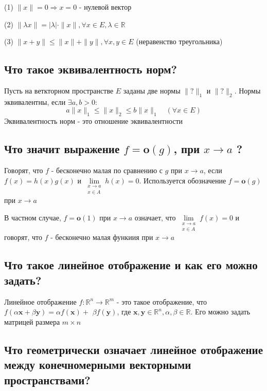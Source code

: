\documentclass[a4paper]{article}
\begin{document}
(1) $\|x\|=0 \Longrightarrow x=0$ - нулевой вектор

(2) $\|\lambda x\|=|\lambda| \cdot\|x\|, \forall x \in E, \lambda \in \mathbb{R}$

(3) $\|x+y\| \leqslant\|x\|+\|y\|, \forall x, y \in E$ (неравенство треугольника)

\subsection{Что такое эквивалентность норм?}


Пусть на веткторном пространстве $E$ заданы две нормы $\|?\|_{1}$ и $\|?\|_{2}$. Нормы эквивалентны, если $\exists a, b>0:$
$$
a\|x\|_{1} \leqslant\|x\|_{2} \leqslant b\|x\|_{1} \quad(\forall x \in E)
$$
Эквивалентность норм - это отношение эквивалентности

\subsection{Что значит выражение $f=\mathbf{o}(g)$, при $x \rightarrow a$ ?}

Говорят, что $f$ - бесконечно малая по сравнению с $g$ при $x \rightarrow a$, если $f(x)=h(x) g(x)$ и $\lim\limits_{\substack{x \rightarrow a \\ x \in A}} h(x)=0$. Используется обозначение $f=\mathbf{o}(g)$ при $x \rightarrow a$

В частном случае, $f=\mathbf{o}(1)$ при $x \rightarrow a$ означает, что $\lim\limits_{\substack{x \rightarrow a \\ x \in A}} f(x)=0$ и говорят, что
$f$ - бесконечно малая функиия при $x \rightarrow a$

\subsection{Что такое линейное отображение и как его можно задать?}

Линейное отображение $f: \mathbb{R}^{n} \rightarrow \mathbb{R}^{m}$ - это такое отображение, что $f(\alpha \mathbf{x}+\beta \mathbf{y})=\alpha f(\mathbf{x})+$ $\beta f(\mathbf{y})$, где $\mathbf{x}, \mathbf{y} \in \mathbb{R}^{n}, \alpha, \beta \in \mathbb{R}$. Его можно задать матрицей размера $m \times n$

\subsection{Что геометрически означает линейное отображение между конечномерными векторными пространствами?}
\end{document}
